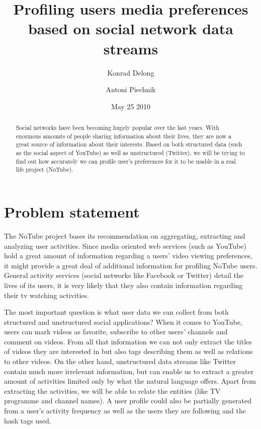 \documentclass{article}
\begin{document}
\title{Profiling users media preferences based on social network data streams}
\author{Konrad Delong \and Antoni Piechnik}
\date{May 25 2010}

\maketitle

\begin{abstract}
Social networks have been becoming hugely popular over the last years. With enormous amounts of people sharing information about their lives, they are now a great source of information about their interests. Based on both structured data (such as the social aspect of YouTube) as well as unstructured (Twitter), we will be trying to find out how accurately we can profile user's preferences for it to be usable in a real life project (NoTube).
\end{abstract}

\section{Problem statement}
The NoTube project bases its recommendation on aggregating, extracting and analyzing user activities. Since media oriented web services (such as YouTube) hold a great amount of information regarding a users' video viewing preferences, it might provide a great deal of additional information for profiling NoTube users. General activity services (social networks like Facebook or Twitter) detail the lives of its users, it is very likely that they also contain information regarding their tv watching activities.

The most important question is what user data we can collect from both structured and unstructured social applications? When it comes to YouTube, users can mark videos as favorite, subscribe to other users' channels and comment on videos. From all that information we can not only extract the titles of videos they are interested in but also tags describing them as well as relations to other videos. On the other hand, unstructured data streams like Twitter contain much more irrelevant information, but can enable us to extract a greater amount of activities limited only by what the natural language offers. Apart from extracting the activities, we will be able to relate the entities (like TV programme and channel names). A user profile could also be partially generated from a user's activity frequency as well as the users they are following and the hash tags used.
\end{document}
